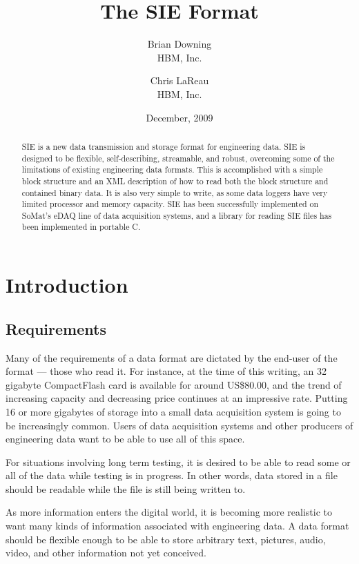 \documentclass{article}
\title{The SIE Format}
\author{
Brian Downing \\ HBM, Inc. \and
Chris LaReau \\ HBM, Inc.
}
\date{December, 2009}
\begin{document}
\maketitle

\begin{abstract}
  SIE is a new data transmission and storage format for engineering
  data.  SIE is designed to be flexible, self-describing, streamable,
  and robust, overcoming some of the limitations of existing
  engineering data formats.  This is accomplished with a simple block
  structure and an XML description of how to read both the block
  structure and contained binary data.  It is also very simple to
  write, as some data loggers have very limited processor and memory
  capacity.  SIE has been successfully implemented on SoMat's eDAQ
  line of data acquisition systems, and a library for reading SIE
  files has been implemented in portable C.
\end{abstract}

\tableofcontents

\section{Introduction}

\subsection{Requirements}

Many of the requirements of a data format are dictated by the end-user
of the format --- those who read it.  For instance, at the time of
this writing, an 32 gigabyte CompactFlash card is available for
around US\$80.00, and the trend of increasing capacity and decreasing
price continues at an impressive rate.  Putting 16 or more
gigabytes of storage into a small data acquisition system is going to
be increasingly common.  Users of data acquisition systems and other
producers of engineering data want to be able to use all of this
space.

For situations involving long term testing, it is desired to be able
to read some or all of the data while testing is in progress.  In other
words, data stored in a file should be readable while the file is still
being written to.

As more information enters the digital world, it is becoming more
realistic to want many kinds of information associated with
engineering data.  A data format should be flexible enough to be able
to store arbitrary text, pictures, audio, video, and other information
not yet conceived.
\end{document}
